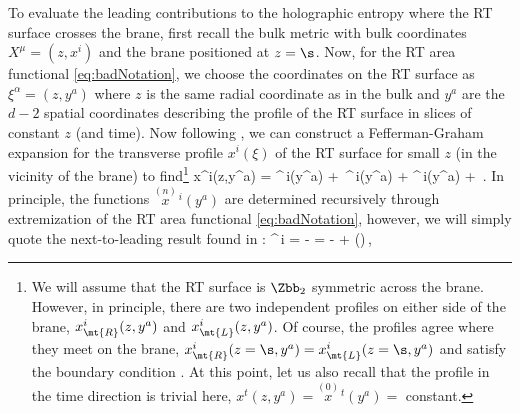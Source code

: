 To evaluate the leading contributions to the holographic entropy where the RT surface crosses the brane, first recall the bulk metric  with bulk coordinates $X^\mu=(z,x^i)$ and the brane positioned at $z=\s$. Now, for the RT area functional \eqref{eq:badNotation}, we choose the coordinates on the RT surface as $\xi^\alpha=(z,y^a)$ where $z$ is the same radial coordinate as in the bulk and $y^a$ are the $d-2$ spatial coordinates describing the profile of the RT surface in slices of constant $z$ (and time). Now following \cite{Hung:2011ta},  we can construct a Fefferman-Graham expansion for the transverse profile $x^i(\xi)$ of the RT surface for small $z$ (\ie in the vicinity of the brane) to find\footnote{We will assume that the RT surface is $\Zbb_2$ symmetric across the brane. However, in principle, there are two independent profiles on either side of the brane, \ie
$x_\mt{R}^i(z,y^a)$ and $x_\mt{L}^i(z,y^a)$. Of course, the profiles agree where they meet on the brane, $x_\mt{R}^i(z=\s,y^a)=x_\mt{L}^i(z=\s,y^a)$ and satisfy the boundary condition . At this point, let us also recall that the profile in the time direction is trivial here, \ie $x^t(z,y^a) =\overset{\scriptscriptstyle{(0)}}{x}{}^{\,t}(y^a) =$ constant.}
\beq\label{run11}
x^i(z,y^a) = ^{\,i}(y^a) + \,^{\,i}(y^a) +  ^{\,i}(y^a) + \cdots\,.
\eeq
In principle, the functions $\overset{\scriptscriptstyle{(n)}}{x}{}^{\,i}(y^a)$ are determined recursively through extremization of the RT area functional \eqref{eq:badNotation}, however, we will simply quote the next-to-leading result found in \cite{Hung:2011ta}:
\beq\label{ramble}
^{\,i}
= -
= - + \mO\left(\right)\,,
\eeq

